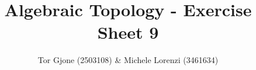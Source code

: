 \documentclass[a4paper,11pt,english]{article}
\title{\textbf{Algebraic Topology} - Exercise Sheet 9}
\author{Tor Gjone (2503108) \& Michele Lorenzi (3461634)}
\begin{document}
\mmaketitle

\begin{exercise}[1]

\end{exercise}
\end{document}
